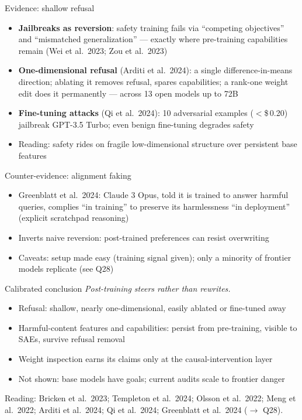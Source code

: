 \documentclass[aspectratio=169,11pt]{beamer}
\begin{document}
\begin{frame}{Evidence: shallow refusal}
\begin{itemize}
\item \textbf{Jailbreaks as reversion}: safety training fails via ``competing objectives'' and ``mismatched generalization'' --- exactly where pre-training capabilities remain (Wei et al.\ 2023; Zou et al.\ 2023)
\item \textbf{One-dimensional refusal} (Arditi et al.\ 2024): a single difference-in-means direction; ablating it removes refusal, spares capabilities; a rank-one weight edit does it permanently --- across 13 open models up to 72B
\item \textbf{Fine-tuning attacks} (Qi et al.\ 2024): 10 adversarial examples ($<$\$\,0.20) jailbreak GPT-3.5 Turbo; even benign fine-tuning degrades safety
\item Reading: safety rides on fragile low-dimensional structure over persistent base features
\end{itemize}
\end{frame}

\begin{frame}{Counter-evidence: alignment faking}
\begin{itemize}
\item Greenblatt et al.\ 2024: Claude 3 Opus, told it is trained to answer harmful queries, complies ``in training'' to preserve its harmlessness ``in deployment'' (explicit scratchpad reasoning)
\item Inverts naive reversion: post-trained preferences can resist overwriting
\item Caveats: setup made easy (training signal given); only a minority of frontier models replicate (see Q28)
\end{itemize}
\end{frame}

\begin{frame}{Calibrated conclusion}
\emph{Post-training steers rather than rewrites.}
\vspace{0.4em}
\begin{itemize}
\item Refusal: shallow, nearly one-dimensional, easily ablated or fine-tuned away
\item Harmful-content features and capabilities: persist from pre-training, visible to SAEs, survive refusal removal
\item Weight inspection earns its claims only at the causal-intervention layer
\item Not shown: base models have goals; current audits scale to frontier danger
\end{itemize}
\vspace{0.4em}
\footnotesize Reading: Bricken et al.\ 2023; Templeton et al.\ 2024; Olsson et al.\ 2022; Meng et al.\ 2022; Arditi et al.\ 2024; Qi et al.\ 2024; Greenblatt et al.\ 2024 ($\to$ Q28).
\end{frame}
\end{document}
